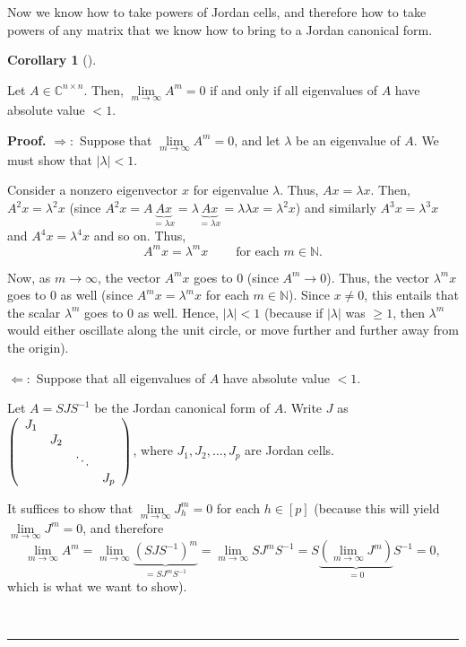 \documentclass[numbers=enddot,12pt,final,onecolumn,notitlepage]{scrartcl}%
\numberwithin{exer}{subsection}
\theoremstyle{definition}
\newtheorem{coro}[theo]{Corollary}
\newenvironment{corollary}[1][]
{\begin{coro}[#1]\begin{leftbar}}
{\end{leftbar}\end{coro}}
\newenvironment{proof}[1][Proof]{\noindent\textbf{#1.} }{\ \rule{0.5em}{0.5em}}
\begin{document}
Now we know how to take powers of Jordan cells, and therefore how to take
powers of any matrix that we know how to bring to a Jordan canonical form.

\begin{corollary}
\label{cor.jnf.powers.to0}Let $A\in\mathbb{C}^{n\times n}$. Then,
$\lim\limits_{m\rightarrow\infty}A^{m}=0$ if and only if all eigenvalues of
$A$ have absolute value $<1$.
\end{corollary}

\begin{proof}
$\Longrightarrow:$ Suppose that $\lim\limits_{m\rightarrow\infty}A^{m}=0$, and
let $\lambda$ be an eigenvalue of $A$. We must show that $\left\vert
\lambda\right\vert <1$.

Consider a nonzero eigenvector $x$ for eigenvalue $\lambda$. Thus, $Ax=\lambda
x$. Then, $A^{2}x=\lambda^{2}x$ (since $A^{2}x=A\underbrace{Ax}_{=\lambda
x}=\lambda\underbrace{Ax}_{=\lambda x}=\lambda\lambda x=\lambda^{2}x$) and
similarly $A^{3}x=\lambda^{3}x$ and $A^{4}x=\lambda^{4}x$ and so on. Thus,
\[
A^{m}x=\lambda^{m}x\ \ \ \ \ \ \ \ \ \ \text{for each }m\in\mathbb{N}.
\]


Now, as $m\rightarrow\infty$, the vector $A^{m}x$ goes to $0$ (since
$A^{m}\rightarrow0$). Thus, the vector $\lambda^{m}x$ goes to $0$ as well
(since $A^{m}x=\lambda^{m}x$ for each $m\in\mathbb{N}$). Since $x\neq0$, this
entails that the scalar $\lambda^{m}$ goes to $0$ as well. Hence, $\left\vert
\lambda\right\vert <1$ (because if $\left\vert \lambda\right\vert $ was
$\geq1$, then $\lambda^{m}$ would either oscillate along the unit circle, or
move further and further away from the origin). \medskip

$\Longleftarrow:$ Suppose that all eigenvalues of $A$ have absolute value $<1$.

Let $A=SJS^{-1}$ be the Jordan canonical form of $A$. Write $J$ as $\left(
\begin{array}
[c]{cccc}%
J_{1} &  &  & \\
& J_{2} &  & \\
&  & \ddots & \\
&  &  & J_{p}%
\end{array}
\right)  $, where $J_{1},J_{2},\ldots,J_{p}$ are Jordan cells.

It suffices to show that $\lim\limits_{m\rightarrow\infty}J_{h}^{m}=0$ for
each $h\in\left[  p\right]  $ (because this will yield $\lim
\limits_{m\rightarrow\infty}J^{m}=0$, and therefore
\[
\lim\limits_{m\rightarrow\infty}A^{m}=\lim\limits_{m\rightarrow\infty
}\underbrace{\left(  SJS^{-1}\right)  ^{m}}_{=SJ^{m}S^{-1}}=\lim
\limits_{m\rightarrow\infty}SJ^{m}S^{-1}=S\underbrace{\left(  \lim
\limits_{m\rightarrow\infty}J^{m}\right)  }_{=0}S^{-1}=0,
\]
which is what we want to show).


\end{proof}
\end{document}

